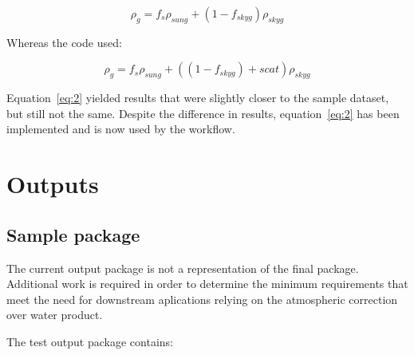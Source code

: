 \documentclass[a4paper]{article}
\begin{document}
    \begin{equation} \label{eq:1}
      \rho_{g} = f_{s}\rho_{sung} + (1 - f_{skyg})\rho_{skyg}
    \end{equation}

     \begin{flushleft}
      Whereas the code used:
    \end{flushleft}

    \begin{equation} \label{eq:2}
      \rho_{g} = f_{s}\rho_{sung} + ((1 - f_{skyg})+scat)\rho_{skyg}
    \end{equation}

    \begin{flushleft}
      Equation~\ref{eq:2} yielded results that were slightly closer to the sample dataset, but still not the same. Despite the difference in results, equation~\ref{eq:2} has been implemented and is now used by the workflow.
    \end{flushleft}

  \section{Outputs}

    \subsection{Sample package}

    \begin{flushleft}
      The current output package is not a representation of the final package. Additional work is required in order to determine the minimum requirements that meet the need for downstream aplications relying on the atmospheric correction over water product. \par
      The test output package contains:
    \end{flushleft}
\end{document}

